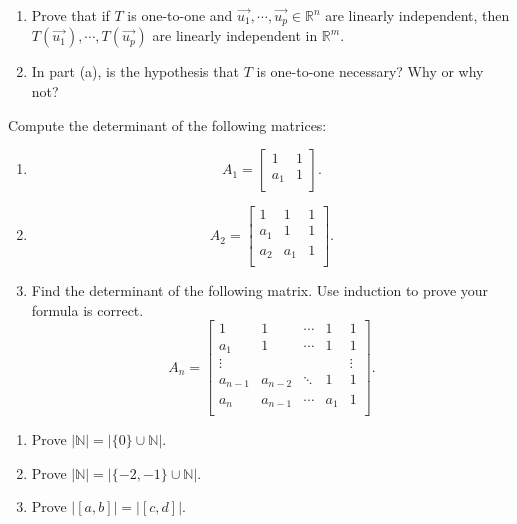 \documentclass[12pt,letterpaper]{article}
\begin{document}
\begin{enumerate}
\Problem 
\begin{enumerate}
	\item Prove that if $T$ is one-to-one and $\vec{u_1}, \cdots, \vec{u_p}\in \mathbb{R}^n$ are linearly independent, then $T(\vec{u_1}), \cdots, T(\vec{u_p})$ are linearly independent in $\mathbb{R}^m$.
	\item In part (a), is the hypothesis that $T$ is one-to-one necessary?  Why or why not?
\end{enumerate}

\Problem Compute the determinant of the following matrices:
\begin{enumerate}
	\item
	\begin{equation*}
	A_1=\begin{bmatrix}
	1 & 1\\
	a_1 & 1\\
	\end{bmatrix}.
	\end{equation*}
	\item 
	\begin{equation*}
	A_2=\begin{bmatrix}
	1 & 1 & 1\\
	a_1 & 1 & 1\\
	a_2 & a_1 & 1\\
	\end{bmatrix}.
	\end{equation*}
	\item Find the determinant of the following matrix.  Use induction to prove your formula is correct.
	\begin{equation*}
	A_n=\begin{bmatrix}
	1 & 1 & \cdots & 1 & 1\\
	a_1 & 1 & \cdots & 1& 1\\
	\vdots &  & &&\vdots\\
	a_{n-1} & a_{n-2} &  \ddots &  1    & 1\\
	a_{n}     & a_{n-1} & \cdots & a_1 & 1\\
	\end{bmatrix}.
	\end{equation*}
\end{enumerate}
\Problem 
\begin{enumerate}
\item Prove $|\mathbb{N}|=|\{0\} \cup \mathbb{N}|$.
\item Prove $|\mathbb{N}|=|\{-2,-1\} \cup \mathbb{N}|$.
\item Prove $|[a,b]|=|[c,d]|$.
\end{enumerate}


\end{enumerate}
\end{document}
